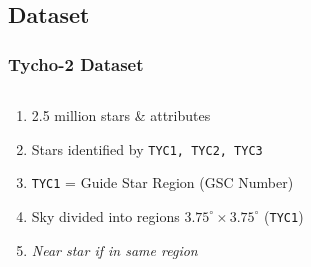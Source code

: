 \documentclass[11pt]{beamer}
\begin{document}
    \subsection{Dataset}\label{subsec:dataset}
    \begin{frame}
        \frametitle{Tycho-2 Dataset}
        \begin{columns}
            \begin{column}{0.5\textwidth}
                \begin{enumerate}
                    \item 2.5 million stars \& attributes \medskip
                    \item Stars identified by \texttt{TYC1, TYC2, TYC3} \medskip
                    \item \texttt{TYC1} = Guide Star Region (GSC Number) \medskip
                    \item Sky divided into regions $3.75^\circ \times 3.75^\circ$ (\texttt{TYC1}) \medskip
                    \item \textit{Near star if in same region}
                \end{enumerate}
            \end{column}
            \begin{column}{0.5\textwidth}
            \end{column}
        \end{columns}
    \end{frame}
\end{document}
